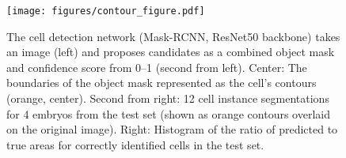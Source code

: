 \begin{figure}
\texttt{[image: figures/contour\_figure.pdf]}
\caption{
    The cell detection network (Mask-RCNN, ResNet50 backbone) takes an
    image (left) and proposes candidates as a combined object mask and
    confidence score from 0--1 (second from left). Center: The boundaries of
    the object mask represented as the cell's contours (orange, center).
    Second from right: 12 cell instance segmentations for 4 embryos from
    the test set (shown as orange contours overlaid on the original
    image). Right: Histogram of the ratio of predicted to
    true areas for correctly identified cells in the test set.
}
\label{fig:contour}
\end{figure}


